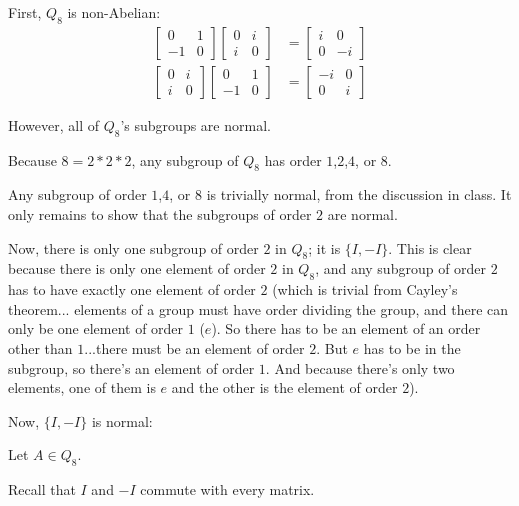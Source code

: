 \documentclass[a4paper,12pt]{article}
\begin{document}
First, $Q_8$ is non-Abelian: 
\begin{align*}
\left[\begin{smallmatrix}0&1\\ -1&0 \end{smallmatrix}\right] \left[\begin{smallmatrix}0&i\\ i&0 \end{smallmatrix}\right] &= \left[\begin{smallmatrix}i&0\\ 0&-i \end{smallmatrix}\right] \\
\left[\begin{smallmatrix}0&i\\ i&0 \end{smallmatrix}\right] \left[\begin{smallmatrix}0&1\\ -1&0 \end{smallmatrix}\right] &= \left[\begin{smallmatrix}-i&0\\ 0&i \end{smallmatrix}\right]
\end{align*}


However, all of $Q_8$'s subgroups are normal.

Because $8 = 2*2*2$, any subgroup of $Q_8$ has order $1$,$2$,$4$, or $8$.

Any subgroup of order $1$,$4$, or $8$ is trivially normal, from the discussion in class. It only remains to show that the subgroups of order $2$ are normal.

Now, there is only one subgroup of order $2$ in $Q_8$; it is $\{I, -I\}$. This is clear because there is only one element of order $2$ in $Q_8$, and any subgroup of order $2$ has to have exactly one element of order $2$ (which is trivial from Cayley's theorem... elements of a group must have order dividing the group, and there can only be one element of order $1$ ($e$). So there has to be an element of an order other than $1$...there must be an element of order $2$. But $e$ has to be in the subgroup, so there's an element of order $1$. And because there's only two elements, one of them is $e$ and the other is the element of order $2$).

Now, $\{I, -I\}$ is normal:

Let $A \in Q_8$.

Recall that $I$ and $-I$ commute with every matrix.
\end{document}

